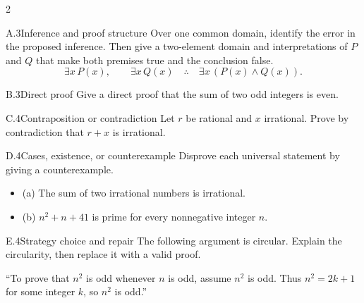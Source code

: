 \documentclass[9pt]{extarticle}
\begin{document}
\begin{multicols}{2}
\begin{CoreProblem}{A.3}{Inference and proof structure}
Over one common domain, identify the error in the proposed inference. Then give
a two-element domain and interpretations of $P$ and $Q$ that make both premises
true and the conclusion false.
\[
\exists x\,P(x),\qquad \exists x\,Q(x)
\quad\therefore\quad
\exists x\,(P(x)\land Q(x)).
\]
\end{CoreProblem}
\begin{CoreProblem}{B.3}{Direct proof}
Give a direct proof that the sum of two odd integers is even.
\end{CoreProblem}
\begin{CoreProblem}{C.4}{Contraposition or contradiction}
Let $r$ be rational and $x$ irrational. Prove by contradiction that $r+x$ is irrational.
\end{CoreProblem}
\columnbreak
\begin{CoreProblem}{D.4}{Cases, existence, or counterexample}
Disprove each universal statement by giving a counterexample.
\begin{itemize}
  \item (a) The sum of two irrational numbers is irrational.
  \item (b) $n^2+n+41$ is prime for every nonnegative integer $n$.
\end{itemize}
\end{CoreProblem}
\begin{CoreProblem}{E.4}{Strategy choice and repair}
The following argument is circular. Explain the circularity, then replace it with a valid proof.

``To prove that $n^2$ is odd whenever $n$ is odd, assume $n^2$ is odd. Thus
$n^2=2k+1$ for some integer $k$, so $n^2$ is odd.''
\end{CoreProblem}
\end{multicols}
\CoreWorkArea
\FormBreak
{}
\end{document}
